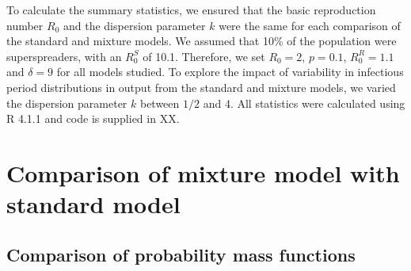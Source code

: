 \documentclass{imammb}
\numberwithin{equation}{section}
\newcommand{\comment}[1]{}
\begin{document}
To calculate the summary statistics, we ensured that the basic reproduction number $R_0$ and the dispersion parameter $k$ were the same for each comparison of the standard and mixture models.  We assumed that 10\% of the population were superspreaders, with an $R_0^S$ of 10.1. Therefore, we set $R_0=2$, $p=0.1$, $R_0^R =1.1$ and $\delta = 9$ for all models studied. To explore the impact of variability in infectious period distributions in output from the standard and mixture models, we varied the dispersion parameter $k$ between $1/2$ and $4$.\comment{To study the effect of the proportion of superspreaders in the population on outbreaks,  we varied $p$ and $\delta$ in the mixture model while keeping the basic reproduction number fixed at $R_0 = R_0^R + p \delta = 2$. As $p$ is increased, the number of additional contacts $\delta$ must be reduced to keep $R_0$ fixed at 2, i.e., a superspreading group that forms a low proportion of the overall population must have a high additional contact rate over the average infectious period. We varied the superspreading proportion $p$ between $0.01$ and $1$ while simultaneously adjusting the number of additional contacts $\delta = (R_0 -R_0^R)/p$ with regular basic reproduction number $R_0^R$ fixed at 1.1 to retain $R_0$ at 2.}  All statistics were calculated using R 4.1.1 and code is supplied in XX. 


\section{Comparison of mixture model with standard model}


\subsection{Comparison of probability mass functions}

\end{document}
